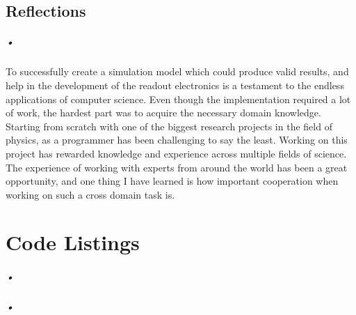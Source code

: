 \documentclass[a4paper, 12pt]{report}
\begin{document}
\section{Reflections}

\paragraph{•}
To successfully create a simulation model which could produce valid results, and help in the development of the readout electronics is a testament to the endless applications of computer science.
Even though the implementation required a lot of work, the hardest part was to acquire the necessary domain knowledge.
Starting from scratch with one of the biggest research projects in the field of physics, as a programmer has been challenging to say the least.
Working on this project has rewarded knowledge and experience across multiple fields of science.
The experience of working with experts from around the world has been a great opportunity, and one thing I have learned is how important cooperation when working on such a cross domain task is.


\appendix
\chapter{Code Listings}
\label{cha:app-code}

\paragraph{•}
\begin{minipage}{\linewidth}

\end{minipage}

\paragraph{•}
\begin{minipage}{\linewidth}

\end{minipage}

{}

\end{document}
